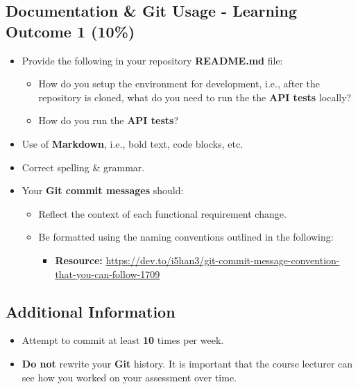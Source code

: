 \documentclass{article}
\begin{document}
\subsection*{Documentation \& Git Usage - Learning Outcome 1 (10\%)}
\begin{itemize}
    \item Provide the following in your repository \textbf{README.md} file:
    \begin{itemize} 
      \item How do you setup the environment for development, i.e., after the repository is cloned, what do you need to run the the \textbf{API tests} locally?
      \item How do you run the \textbf{API tests}?
    \end{itemize}
    \item Use of \textbf{Markdown}, i.e., bold text, code blocks, etc.
    \item Correct spelling \& grammar.
    \item Your \textbf{Git commit messages} should:
    \begin{itemize}
      \item Reflect the context of each functional requirement change. 
      \item Be formatted using the naming conventions outlined in the following:
            \begin{itemize}
              \item \textbf{Resource:} \small\href{https://dev.to/i5han3/git-commit-message-convention-that-you-can-follow-1709}{https://dev.to/i5han3/git-commit-message-convention-that-you-can-follow-1709}
            \end{itemize} 
    \end{itemize}
\end{itemize}
          
\subsection*{Additional Information}
\begin{itemize}
    \item Attempt to commit at least \textbf{10} times per week.
    \item \textbf{Do not} rewrite your \textbf{Git} history. It is important that the course lecturer can see how you worked on your assessment over time. 
\end{itemize} 
\end{document}
